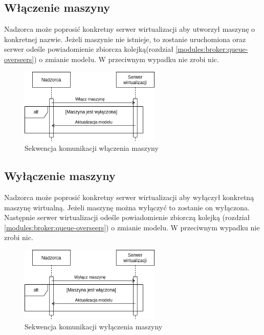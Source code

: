 \documentclass[../opis-rozwiazania.tex]{subfiles}
\begin{document}
\subsection{Włączenie maszyny}

Nadzorca może poprosić konkretny serwer wirtualizacji aby utworzył maszynę o konkretnej nazwie.
Jeżeli maszynie nie istnieje, to zostanie uruchomiona oraz serwer odeśle powiadomienie zbiorcza kolejką(rozdział \ref{modules:broker:queue-overseers}) o zmianie modelu.
W przeciwnym wypadku nie zrobi nic.

\begin{figure}[H]
    \centering
    \includegraphics[width=0.6\textwidth]{../diagrams/sequence_diagrams/wlaczenie_maszyny.png}
    \caption{Sekwencja komunikacji włączenia maszyny}
    \label{figure:diagrams:sequence_diagrams:wlaczenie_maszyny}
\end{figure}

\subsection{Wyłączenie maszyny}

Nadzorca może poprosić konkretny serwer wirtualizacji aby wyłączył konkretną maszynę wirtualną.
Jeżeli maszynę można wyłączyć to zostanie on wyłączona.
Następnie serwer wirtualizacji odeśle powiadomienie zbiorczą kolejką (rozdział \ref{modules:broker:queue-overseers}) o zmianie modelu.
W przeciwnym wypadku nie zrobi nic.

\begin{figure}[H]
    \centering
    \includegraphics[width=0.6\textwidth]{../diagrams/sequence_diagrams/wylaczenie_maszyny.png}
    \caption{Sekwencja komunikacji wyłączenia maszyny}
    \label{figure:diagrams:sequence_diagrams:wylaczenie_maszyny}
\end{figure}
\end{document}

